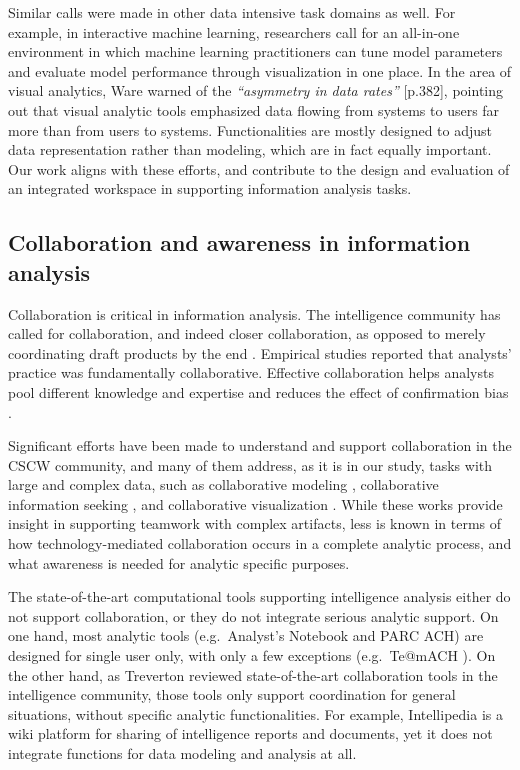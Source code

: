 Similar calls were made in other data intensive task domains as well. For
example, in interactive machine learning, researchers \cite{Chen2016,
Amershi2015} call for an all-in-one environment in which machine learning
practitioners can tune model parameters and evaluate model performance through
visualization in one place. In the area of visual analytics, Ware
\cite{Ware2012} warned of the \emph{``asymmetry in data rates''} [p.382],
pointing out that visual analytic tools emphasized data flowing from systems to
users far more than from users to systems. Functionalities are mostly designed
to adjust data representation rather than modeling, which are in fact equally
important. Our work aligns with these efforts, and contribute to the design and
evaluation of an integrated workspace in supporting information analysis tasks.

\subsection{Collaboration and awareness in information analysis}

Collaboration is critical in information analysis. The intelligence community has called for collaboration, and indeed closer collaboration, as opposed to merely coordinating draft products by the end \cite{Vision2015}. Empirical studies \cite{Chin2009,Kang2011} reported that analysts' practice was fundamentally collaborative. Effective collaboration helps analysts pool different knowledge and expertise and reduces the effect of confirmation bias \cite{Heuer1999}.

Significant efforts have been made to understand and support collaboration in the CSCW community, and many of them address, as it is in our study, tasks with large and complex data, such as collaborative modeling \cite{Kolfschoten2008, Prilla2013}, collaborative information seeking \cite{Golovchinsky2009a, Kelly2014a}, and collaborative visualization \cite{Isenberg2011,Heer2008e}. While these works provide insight in supporting teamwork with complex artifacts, less is known in terms of how technology-mediated collaboration occurs in a complete analytic process, and what awareness is needed for analytic specific purposes.

The state-of-the-art computational tools supporting intelligence analysis either
do not support collaboration, or they do not integrate serious analytic
support. On one hand, most analytic tools (e.g.~Analyst's Notebook and PARC ACH)
are designed for single user only, with only a few exceptions (e.g.~Te@mACH
\cite{Globalytica2017}). On the other hand, as Treverton \cite{Treverton2016}
reviewed state-of-the-art collaboration tools in the intelligence community, those
tools only support coordination for general situations, without specific analytic functionalities. For example, Intellipedia
\cite{Intelink2017} is a wiki platform for sharing of intelligence reports and
documents, yet it does not integrate functions for data modeling and analysis at all.


